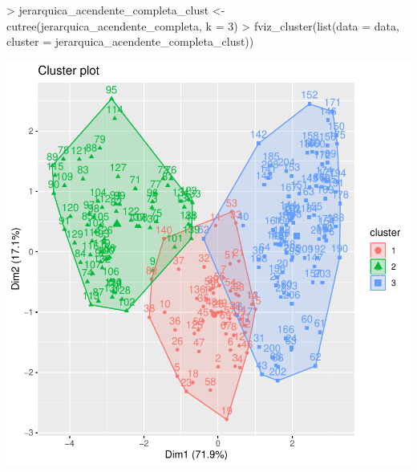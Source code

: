\documentclass [a4paper] {article}
\begin{document}
\begin{center}
\begin{Schunk}
\begin{Sinput}
> jerarquica_acendente_completa_clust <- cutree(jerarquica_acendente_completa, k = 3)
> fviz_cluster(list(data = data, cluster = jerarquica_acendente_completa_clust))
\end{Sinput}
\end{Schunk}
\includegraphics{entrega-jerarquica_acendente_completa_plot}
\end{center}
\end{document}
